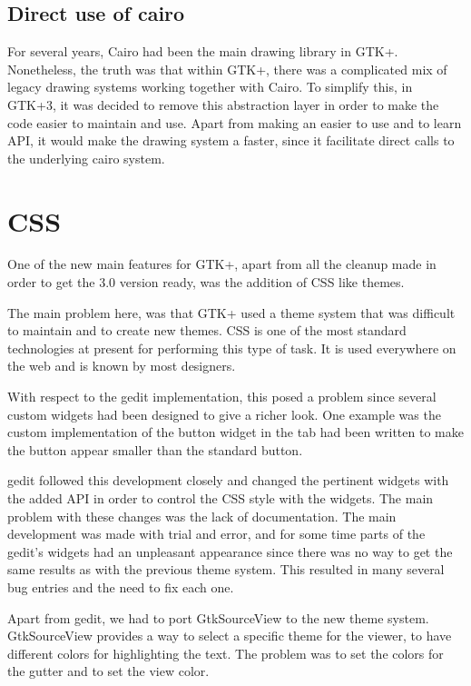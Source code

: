\subsection{Direct use of cairo}

For several years, Cairo had been the main drawing library in GTK+.  Nonetheless, the truth was that 
within GTK+, there was a complicated mix of legacy drawing systems working together with Cairo. 
To simplify this, in GTK+3, it was decided to remove this abstraction layer in order 
to make the code easier to maintain and use. Apart from making an easier to use and to learn API, 
it would make the drawing system a faster, since it facilitate direct calls to the underlying cairo system.

\section{CSS}

One of the new main features for GTK+, apart from all the cleanup made in order to get the 3.0 version ready, was the 
addition of CSS like themes.

The main problem here, was that GTK+ used a theme system that was difficult to maintain and to create new themes. CSS is one of the 
most standard technologies at present for performing this type of task. It is used everywhere on the web and is known by most designers. 

With respect to the gedit implementation, this posed a problem since several custom widgets had been designed to give a 
richer look.  One example was the custom implementation of the button widget in the tab had been written to make the button appear 
smaller than the standard button.

gedit followed this development closely and changed the pertinent widgets with the added API in order to control the 
CSS style with the widgets. The main problem with these changes was the lack of documentation. The main development was made with trial 
and error,  and for some time parts of the gedit's widgets had an unpleasant appearance since there was no way to get the same results 
as with the previous theme system. This resulted in many several bug entries and the need to fix each one.

Apart from gedit, we had to port GtkSourceView to the new theme system. GtkSourceView provides a way to select a specific theme for the viewer, to have different colors for highlighting the text. The problem  was to set the colors for the gutter and to set the view color.

